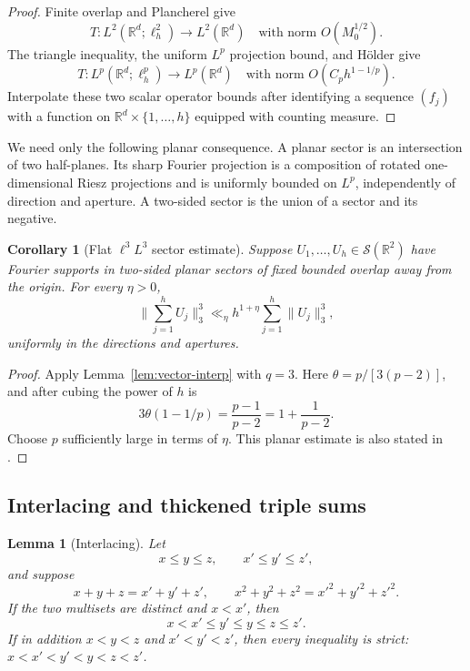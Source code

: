 \documentclass{amsart}
\numberwithin{equation}{section}
\newtheorem{lemma}[theorem]{Lemma}
\newtheorem{corollary}[theorem]{Corollary}
\newcommand{\R}{\mathbb{R}}
\begin{document}
\begin{proof}
Finite overlap and Plancherel give
\[
 T:L^2(\R^d;\ell_h^2)\longrightarrow L^2(\R^d)
 \quad\text{with norm }O(M_0^{1/2}).
\]
The triangle inequality, the uniform $L^p$ projection bound, and H\"older give
\[
 T:L^p(\R^d;\ell_h^p)\longrightarrow L^p(\R^d)
 \quad\text{with norm }O(C_ph^{1-1/p}).
\]
Interpolate these two scalar operator bounds after identifying a sequence
$(f_j)$ with a function on $\R^d\times\{1,\ldots,h\}$ equipped with counting
measure.
\end{proof}

We need only the following planar consequence.  A planar sector is an
intersection of two half-planes.  Its sharp Fourier projection is a
composition of rotated one-dimensional Riesz projections and is uniformly
bounded on $L^p$, independently of direction and aperture.  A two-sided
sector is the union of a sector and its negative.

\begin{corollary}[Flat $\ell^3L^3$ sector estimate]\label{cor:flat-cone}
Suppose $U_1,\ldots,U_h\in\mathcal S(\R^2)$ have Fourier supports in
two-sided planar sectors of fixed bounded overlap away from the origin.
For every $\eta>0$,
\begin{equation}\label{eq:flat-cone}
 \Big\|\sum_{j=1}^hU_j\Big\|_3^3
 \ll_\eta h^{1+\eta}\sum_{j=1}^h\|U_j\|_3^3,
\end{equation}
uniformly in the directions and apertures.
\end{corollary}

\begin{proof}
Apply Lemma~\ref{lem:vector-interp} with $q=3$.  Here
$\theta=p/[3(p-2)]$, and after cubing the power of $h$ is
\[
 3\theta(1-1/p)=\frac{p-1}{p-2}=1+\frac1{p-2}.
\]
Choose $p$ sufficiently large in terms of $\eta$.
This planar estimate is also stated in \cite[Corollary 2.10]{Cushman-Demeter-Wu}.
\end{proof}

\medskip 

\subsection{Interlacing and thickened triple sums}

\begin{lemma}[Interlacing]\label{lem:interlacing}
Let
\[
 x\le y\le z,
 \qquad
 x'\le y'\le z',
\]
and suppose
\[
 x+y+z=x'+y'+z',
 \qquad
 x^2+y^2+z^2=x'^2+y'^2+z'^2.
\]
If the two multisets are distinct and $x<x'$, then
\begin{equation}\label{eq:interlace-chain}
 x<x'\le y'\le y\le z\le z'.
\end{equation}
If in addition $x<y<z$ and $x'<y'<z'$, then every inequality is strict:
$x<x'<y'<y<z<z'$.
\end{lemma}
\end{document}
